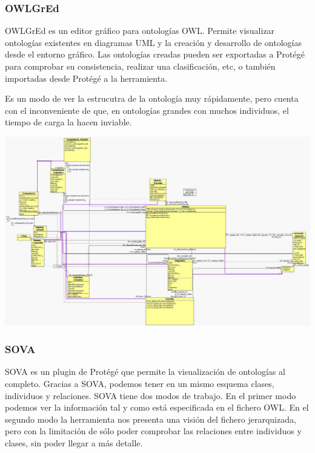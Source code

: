 \subsubsection{OWLGrEd} OWLGrEd es un editor gráfico para ontologías OWL. Permite visualizar ontologías existentes en diagramas UML y la creación y desarrollo de ontologías desde el entorno gráfico. Las ontologías creadas pueden ser exportadas a Protégé para comprobar su consistencia, realizar una clasificación, etc, o también importadas desde Protégé a la herramienta.

Es un modo de ver la estrucutra de la ontología muy rápidamente, pero cuenta con el inconveniente de que, en ontologías grandes con muchos individuos, el tiempo de carga la hacen inviable.

\begin{center}
		\includegraphics[width=1.00\textwidth]{Imagenes/Herramientas-OWLGrEd.png}
\end{center}

\subsubsection{SOVA} SOVA es un plugin de Protégé que permite la visualización de ontologías al completo. Gracias a SOVA, podemos tener en un mismo esquema clases, individuos y relaciones. 
SOVA tiene dos modos de trabajo. En el primer modo podemos ver la información tal y como está especificada en el fichero OWL. En el segundo modo la herramienta nos presenta una visión del fichero jerarquizada, pero con la limitación de sólo poder comprobar las relaciones entre individuos y clases, sin poder llegar a más detalle.


